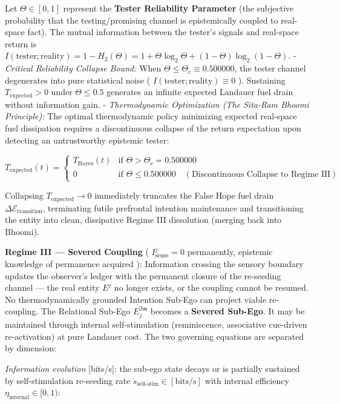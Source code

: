 \documentclass[11pt,a4paper]{article}
\theoremstyle{definition}
\theoremstyle{remark}
\begin{document}
Let $\Theta \in [0, 1]$ represent the \textbf{Tester Reliability Parameter} (the subjective probability that the testing/promising channel is epistemically coupled to real-space fact). The mutual information between the tester's signals and real-space return is $I(\text{tester}; \text{reality}) = 1 - H_2(\Theta) = 1 + \Theta\log_2\Theta + (1-\Theta)\log_2(1-\Theta)$.
- \textit{Critical Reliability Collapse Bound:} When $\Theta \le \Theta_c \equiv 0.500000$, the tester channel degenerates into pure statistical noise ( $I(\text{tester}; \text{reality}) \equiv 0$ ). Sustaining $T_{\text{expected}} > 0$ under $\Theta \le 0.5$ generates an infinite expected Landauer fuel drain without information gain.
- \textit{Thermodynamic Optimization (The Sita-Ram Bhoomi Principle):} The optimal thermodynamic policy minimizing expected real-space fuel dissipation requires a discontinuous collapse of the return expectation upon detecting an untrustworthy epistemic tester:


\begin{equation}
\boxed{T_{\text{expected}}(t) = \begin{cases} T_{\text{Bayes}}(t) & \text{if } \Theta > \Theta_c = 0.500000 \\ 0 & \text{if } \Theta \le 0.500000 \quad \left(\text{Discontinuous Collapse to Regime III}\right) \end{cases}}
\end{equation}


Collapsing $T_{\text{expected}} \to 0$ immediately truncates the False Hope fuel drain $\Delta\mathcal{E}_{\text{transition}}$, terminating futile prefrontal intention maintenance and transitioning the entity into clean, dissipative Regime III dissolution (merging back into Bhoomi).

\textbf{Regime III — Severed Coupling} ( $I_{\text{sense}}^j = 0$ permanently, epistemic knowledge of permanence acquired ): Information crossing the sensory boundary updates the observer's ledger with the permanent closure of the re-seeding channel — the real entity $E^j$ no longer exists, or the coupling cannot be resumed. No thermodynamically grounded Intention Sub-Ego can project viable re-coupling. The Relational Sub-Ego $E_j^{\mathfrak{Im}}$ becomes a \textbf{Severed Sub-Ego}. It may be maintained through internal self-stimulation (reminiscence, associative cue-driven re-activation) at pure Landauer cost. The two governing equations are separated by dimension:

\textit{Information evolution} [bits/s]: the sub-ego state decays or is partially sustained by self-stimulation re-seeding rate $\dot{s}_{\text{self-stim}} \in [\text{bits/s}]$ with internal efficiency $\eta_{\text{internal}} \in [0, 1)$:
\end{document}
